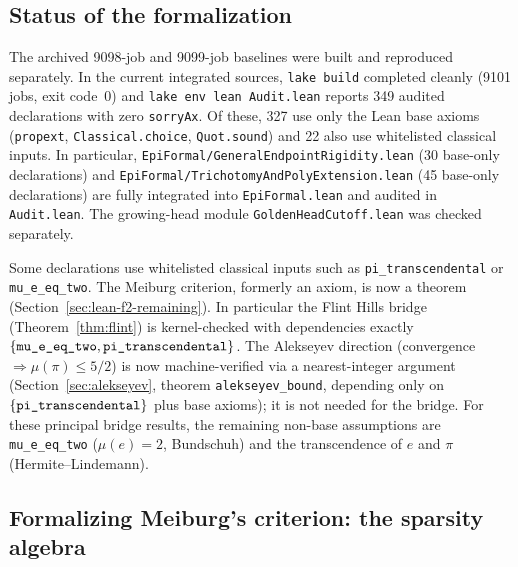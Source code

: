 \documentclass[11pt]{amsart}
\theoremstyle{definition}
\theoremstyle{remark}
\numberwithin{equation}{section}
\newcommand{\irr}{\mu}
\newcommand{\ee}{e}
\begin{document}
\subsection{Status of the formalization}\label{sec:lean-status}

The archived 9098-job and 9099-job baselines were built and reproduced separately.
In the current integrated sources, \texttt{lake build} completed cleanly
(9101 jobs, exit code~0) and \texttt{lake env lean Audit.lean} reports
349 audited declarations with zero \texttt{sorryAx}. Of these, 327 use
only the Lean base axioms (\texttt{propext}, \texttt{Classical.choice},
\texttt{Quot.sound}) and 22 also use whitelisted classical inputs.
In particular, \texttt{EpiFormal/\allowbreak{}GeneralEndpoint\allowbreak{}Rigidity.lean}
(30 base-only declarations) and
\texttt{EpiFormal/\allowbreak{}TrichotomyAnd\allowbreak{}PolyExtension.lean}
(45 base-only declarations) are fully integrated into \texttt{EpiFormal.lean}
and audited in \texttt{Audit.lean}.
The growing-head module \texttt{GoldenHeadCutoff.lean} was checked separately.

Some declarations use whitelisted classical inputs such
as \texttt{pi\_transcendental} or \texttt{mu\_e\_eq\_two}.
The Meiburg criterion, formerly an axiom, is now a theorem (Section~\ref{sec:lean-f2-remaining}). In particular the Flint Hills bridge (Theorem~\ref{thm:flint}) is kernel-checked with dependencies exactly $\{\texttt{mu\_\allowbreak{}e\_\allowbreak{}eq\_\allowbreak{}two},\texttt{pi\_\allowbreak{}transcendental}\}$. The Alekseyev direction (convergence $\Rightarrow\irr(\pi)\le5/2$) is now machine-verified via a nearest-integer argument (Section~\ref{sec:alekseyev}, theorem \texttt{alekseyev\_\allowbreak{}bound}, depending only on $\{\texttt{pi\_\allowbreak{}transcendental}\}$ plus base axioms); it is not needed for the bridge. For these principal bridge results, the remaining non-base assumptions are \texttt{mu\_\allowbreak{}e\_\allowbreak{}eq\_\allowbreak{}two} ($\irr(\ee)=2$, Bundschuh) and the transcendence of $\ee$ and $\pi$ (Hermite--Lindemann).

\subsection{Formalizing Meiburg's criterion: the sparsity algebra}\label{sec:lean-f2}
\end{document}
